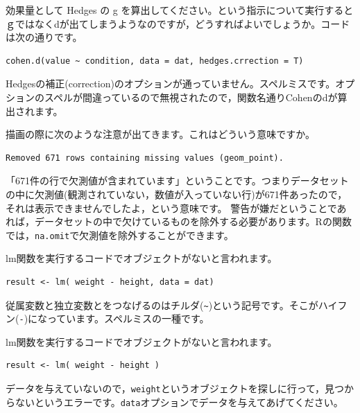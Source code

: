 \documentclass{ltjsbook}
\begin{document}
\begin{FAQ}{効果量として Hedges の g を算出してください。という指示について実行するとｇではなくdが出てしまうようなのですが，どうすればよいでしょうか。コードは次の通りです。}{}
	\begin{verbatim}
cohen.d(value ~ condition, data = dat, hedges.crrection = T)
\end{verbatim}
	Hedgesの補正(correction)のオプションが通っていません。スペルミスです。オプションのスペルが間違っているので無視されたので，関数名通りCohenのdが算出されます。
\end{FAQ}


\begin{FAQ}{描画の際に次のような注意が出てきます。これはどういう意味ですか。}{}
	\begin{verbatim}Removed 671 rows containing missing values (geom_point).\end{verbatim}
	「671件の行で欠測値が含まれています」ということです。つまりデータセットの中に欠測値(観測されていない，数値が入っていない行)が671件あったので，それは表示できませんでしたよ，という意味です。
	警告が嫌だということであれば，データセットの中で欠けているものを除外する必要があります。Rの関数では，\verb|na.omit|で欠測値を除外することができます。
\end{FAQ}

\begin{FAQ}{lm関数を実行するコードでオブジェクトがないと言われます。}{}
	\begin{verbatim}
result <- lm( weight - height, data = dat)
\end{verbatim}
	従属変数と独立変数とをつなげるのはチルダ(\verb|~|)という記号です。そこがハイフン(\verb|-|)になっています。スペルミスの一種です。
\end{FAQ}

\begin{FAQ}{lm関数を実行するコードでオブジェクトがないと言われます。}{}
	\begin{verbatim}
result <- lm( weight - height )
\end{verbatim}
	データを与えていないので，\verb|weight|というオブジェクトを探しに行って，見つからないというエラーです。\verb|data|オプションでデータを与えてあげてください。
\end{FAQ}
\end{document}
